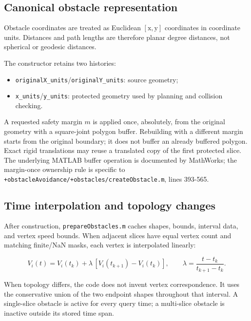 \documentclass[10pt,letterpaper]{article}
\newcommand{\file}[1]{\nolinkurl{#1}}
\newcommand{\src}[2]{\file{#1}, lines #2}
\begin{document}
\subsection{Canonical obstacle representation}

Obstacle coordinates are treated as Euclidean $[\mathrm{x},
\mathrm{y}]$ coordinates in coordinate units. Distances and path lengths are
therefore planar degree distances, not spherical or geodesic distances.

The constructor retains two histories:

\begin{itemize}
  \item \file{originalX_units}/\file{originalY_units}: source geometry;
  \item \file{x_units}/\file{y_units}: protected geometry used by planning and
  collision checking.
\end{itemize}

A requested safety margin $m$ is applied once, absolutely, from the original
geometry with a square-joint polygon buffer. Rebuilding with a different
margin starts from the original boundary; it does not buffer an already
buffered polygon. Exact rigid translations may reuse a translated copy of the
first protected slice. The underlying MATLAB buffer operation is documented by
MathWorks\cite{mathworksPolybuffer}; the margin-once ownership rule is specific
to \src{+obstacleAvoidance/+obstacles/createObstacle.m}{393-565}.

\subsection{Time interpolation and topology changes}

After construction, \file{prepareObstacles.m} caches shapes, bounds, interval
data, and vertex speed bounds. When adjacent slices have equal vertex count and
matching finite/NaN masks, each vertex is interpolated linearly:

\begin{equation}
V_i(t)=V_i(t_k)+\lambda\,[V_i(t_{k+1})-V_i(t_k)],\qquad
\lambda=\frac{t-t_k}{t_{k+1}-t_k}.
\end{equation}

When topology differs, the code does not invent vertex correspondence. It uses
the conservative union of the two endpoint shapes throughout that interval.
A single-slice obstacle is active for every query time; a multi-slice obstacle
is inactive outside its stored time span.
\end{document}

